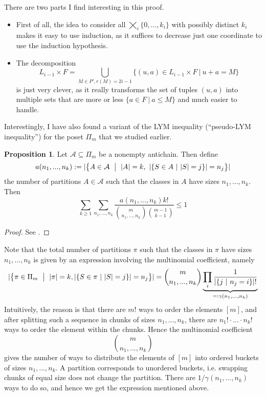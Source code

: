 \documentclass{scrartcl}
\theoremstyle{definition}
\newtheorem{proposition}[definition]{Proposition}
\begin{document}
There are two parts I find interesting in this proof.
\begin{itemize}
    \item First of all, the idea to consider all $\bigtimes_i \{ 0, ..., k_i \}$ with possibly distinct $k_i$ makes it easy to use induction, as it suffices to decrease just one coordinate to use the induction hypothesis.
    \item The decomposition
    \begin{equation*}
        L_{i - 1} \times F = \bigcup_{M \in P', r(M) = 2i - 1} \{ (u, a) \in L_{i - 1} \times F \ | \ u + a = M \}
    \end{equation*}
    is just very clever, as it really transforms the set of tuples $(u, a)$ into multiple sets that are more or less $\{ a \in F \ | \ a \leq M \}$ and much easier to handle.
\end{itemize}
Interestingly, I have also found a variant of the LYM inequality (``pseudo-LYM inequality'') for the poset $\Pi_m$ that we studied earlier.
\begin{proposition}
    \label{prop:lym_variant_partitions}
    Let $\mathcal{A} \subseteq \Pi_m$ be a nonempty antichain. Then define
    \begin{equation*}
        a(n_1, ..., n_k) := |\bigl\{ A \in \mathcal{A} \ \bigm| \ |A| = k, \ |\{ S \in A \ | \ |S| = j \}| = n_j \bigr\}|
    \end{equation*}
    the number of partitions $A \in \mathcal{A}$ such that the classes in $A$ have sizes $n_1, ..., n_k$.
    Then
    \begin{equation*}
        \sum_{k \geq 1} \sum_{n_1, ..., n_k} \frac {a(n_1, ..., n_k) k!} {{m \choose n_1, ..., n_k} {m - 1 \choose k - 1}} \leq 1
    \end{equation*}
\end{proposition}
\begin{proof}
    See \cite{lym_partitions}.
\end{proof}
Note that the total number of partitions $\pi$ such that the classes in $\pi$ have sizes $n_1, ..., n_k$ is given by an expression involving the multinomial coefficient, namely
\begin{equation*}
    |\bigl\{ \pi \in \Pi_m \ \bigm| \ |\pi| = k, |\{ S \in \pi \ | \ |S| = j\}| = n_j \bigr\}| = {m \choose n_1, ..., n_k} \underbrace{ \prod_i \frac 1 {|\{ j \ | \ n_j = i\}|!} }_{=: \gamma(n_1, ..., n_k)}
\end{equation*}
Intuitively, the reason is that there are $m!$ ways to order the elements $[m]$, and after splitting such a sequence in chunks of sizes $n_1, ..., n_k$, there are $n_1! \cdot ... \cdot n_k!$ ways to order the element within the chunks.
Hence the multinomial coefficient
\begin{equation*}
    {m \choose n_1, ..., n_k}
\end{equation*}
gives the number of ways to distribute the elements of $[m]$ into ordered buckets of sizes $n_1, ..., n_k$.
A partition corresponds to unordered buckets, i.e. swapping chunks of equal size does not change the partition.
There are $1/\gamma(n_1, ..., n_k)$ ways to do so, and hence we get the expression mentioned above.
\end{document}
